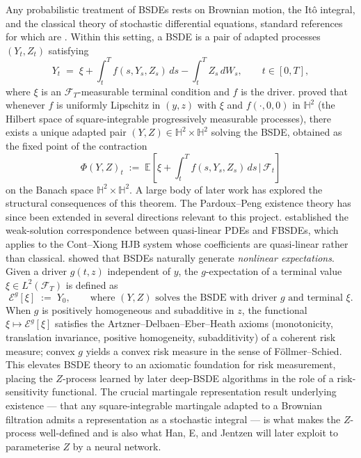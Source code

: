 Any probabilistic treatment of BSDEs rests on Brownian motion, the
It\^{o} integral, and the classical theory of stochastic differential
equations, standard references for which are \citet{oksendal1998}.
Within this setting, a BSDE is a pair of adapted processes $(Y_t, Z_t)$
satisfying
\[
Y_t \;=\; \xi + \int_t^T f(s, Y_s, Z_s)\,ds - \int_t^T Z_s\,dW_s,
\qquad t \in [0, T],
\]
where $\xi$ is an $\mathcal{F}_T$-measurable terminal condition and
$f$ is the driver.  \citet{pardoux1990} proved that whenever $f$ is
uniformly Lipschitz in $(y, z)$ with $\xi$ and $f(\cdot, 0, 0)$ in
$\mathbb{H}^2$ (the Hilbert space of square-integrable progressively
measurable processes), there exists a unique adapted pair
$(Y, Z) \in \mathbb{H}^2 \times \mathbb{H}^2$ solving the BSDE,
obtained as the fixed point of the contraction
\[
  \Phi(Y, Z)_t \;:=\; \mathbb{E}\!\left[\xi + \int_t^T f(s, Y_s, Z_s)\,ds \,\Big|\,
    \mathcal{F}_t\right]
\]
on the Banach space $\mathbb{H}^2 \times \mathbb{H}^2$.  A large
body of later work has explored the structural consequences of this
theorem.  The Pardoux--Peng existence theory has since been extended in
several directions relevant to this project.  \citet{feng2018}
established the weak-solution correspondence between quasi-linear
PDEs and FBSDEs, which applies to the Cont--Xiong HJB system whose
coefficients are quasi-linear rather than classical.  \citet{peng2004} showed
that BSDEs naturally generate \emph{nonlinear expectations}.  Given
a driver $g(t, z)$ independent of $y$, the $g$-expectation of a
terminal value $\xi \in L^2(\mathcal{F}_T)$ is defined as
\[
  \mathcal{E}^g[\xi] \;:=\; Y_0,
  \qquad \text{where } (Y, Z) \text{ solves the BSDE with driver }
  g \text{ and terminal } \xi.
\]
When $g$ is positively homogeneous and subadditive in $z$, the
functional $\xi \mapsto \mathcal{E}^g[\xi]$ satisfies the
Artzner--Delbaen--Eber--Heath axioms (monotonicity, translation
invariance, positive homogeneity, subadditivity) of a coherent
risk measure; convex $g$ yields a convex risk measure in the
sense of F\"ollmer--Schied.  This elevates BSDE theory to an
axiomatic foundation for risk measurement, placing the $Z$-process
learned by later deep-BSDE algorithms in the role of a
risk-sensitivity functional.  The crucial martingale representation result underlying
existence — that any square-integrable martingale adapted to a
Brownian filtration admits a representation as a stochastic integral —
is what makes the $Z$-process well-defined and is also what Han, E,
and Jentzen will later exploit to parameterise $Z$ by a neural
network.

